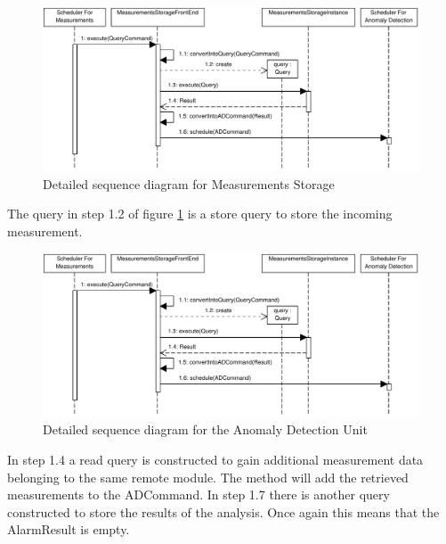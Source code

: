\begin{figure}[H]
	\begin{centering}
		\includegraphics[width=\textwidth]{figs/scenario-5-6b.pdf}
		\caption{Detailed sequence diagram for Measurements Storage}
		\label{fig:scenario-5-6b}
	\end{centering}
\end{figure}

\npar The query in step 1.2 of figure \ref{fig:scenario-5-6b} is a store query
to store the incoming measurement.

\begin{figure}[H]
	\begin{centering}
		\includegraphics[width=\textwidth]{figs/scenario-5-6b.pdf}
		\caption{Detailed sequence diagram for the Anomaly Detection Unit}
		\label{fig:scenario-5-6c}
	\end{centering}
\end{figure}

\npar In step 1.4 a read query is constructed to gain additional measurement
data belonging to the same remote module. The  method
will add the retrieved measurements to the ADCommand. In step 1.7 there is
another query constructed to store the results of the analysis. Once again this
means that the AlarmResult is empty.



